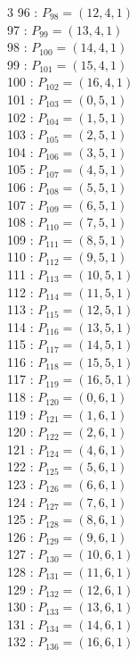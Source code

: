 \documentclass{article}
\begin{document}
{\begin{multicols}{3}
96 : $P_{98}=( 12, 4, 1 )$\\
97 : $P_{99}=( 13, 4, 1 )$\\
98 : $P_{100}=( 14, 4, 1 )$\\
99 : $P_{101}=( 15, 4, 1 )$\\
100 : $P_{102}=( 16, 4, 1 )$\\
101 : $P_{103}=( 0, 5, 1 )$\\
102 : $P_{104}=( 1, 5, 1 )$\\
103 : $P_{105}=( 2, 5, 1 )$\\
104 : $P_{106}=( 3, 5, 1 )$\\
105 : $P_{107}=( 4, 5, 1 )$\\
106 : $P_{108}=( 5, 5, 1 )$\\
107 : $P_{109}=( 6, 5, 1 )$\\
108 : $P_{110}=( 7, 5, 1 )$\\
109 : $P_{111}=( 8, 5, 1 )$\\
110 : $P_{112}=( 9, 5, 1 )$\\
111 : $P_{113}=( 10, 5, 1 )$\\
112 : $P_{114}=( 11, 5, 1 )$\\
113 : $P_{115}=( 12, 5, 1 )$\\
114 : $P_{116}=( 13, 5, 1 )$\\
115 : $P_{117}=( 14, 5, 1 )$\\
116 : $P_{118}=( 15, 5, 1 )$\\
117 : $P_{119}=( 16, 5, 1 )$\\
118 : $P_{120}=( 0, 6, 1 )$\\
119 : $P_{121}=( 1, 6, 1 )$\\
120 : $P_{122}=( 2, 6, 1 )$\\
121 : $P_{124}=( 4, 6, 1 )$\\
122 : $P_{125}=( 5, 6, 1 )$\\
123 : $P_{126}=( 6, 6, 1 )$\\
124 : $P_{127}=( 7, 6, 1 )$\\
125 : $P_{128}=( 8, 6, 1 )$\\
126 : $P_{129}=( 9, 6, 1 )$\\
127 : $P_{130}=( 10, 6, 1 )$\\
128 : $P_{131}=( 11, 6, 1 )$\\
129 : $P_{132}=( 12, 6, 1 )$\\
130 : $P_{133}=( 13, 6, 1 )$\\
131 : $P_{134}=( 14, 6, 1 )$\\
132 : $P_{136}=( 16, 6, 1 )$\\

\end{multicols}}
\end{document}

